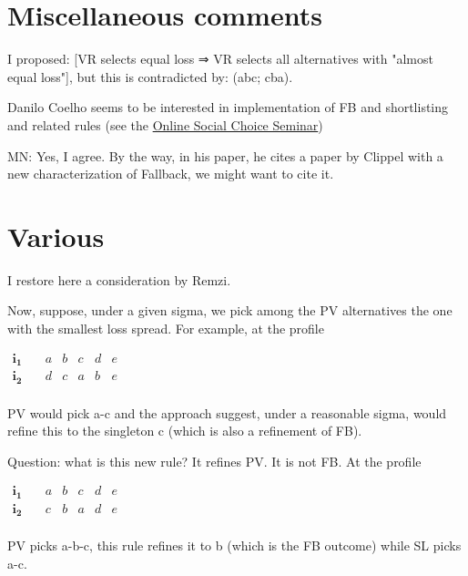 \documentclass[version=3.21, pagesize, twoside=off, bibliography=totoc, DIV=calc, fontsize=12pt, a4paper]{scrartcl}
\begin{document}
\section{Miscellaneous comments}
I proposed: [VR selects equal loss ⇒ VR selects all alternatives with "almost equal loss"], but this is contradicted by: (abc; cba).


Danilo Coelho seems to be interested in implementation of FB and shortlisting and related rules (see the \href{https://www.cmss.auckland.ac.nz/2020/06/03/online-social-choice-seminar-series/}{Online Social Choice Seminar})

\color{green}MN: Yes, I agree. By the way, in his paper, he cites a paper by Clippel with a new characterization of Fallback, we might want to cite it.\color{black}



\appendix
\section{Various}
I restore here a consideration by Remzi.

\begin{remark}[Consideration]
Now, suppose, under a given sigma, we pick among the PV alternatives the one with the smallest loss spread. For example, at the profile 
\begin{center}
	$
	\begin{array}{cccccc}
		\mathbf{i_1} \quad &a&b&c&d&e\\
		\mathbf{i_2} \quad &d&c&a&b&e\\
	\end{array}
	$
\end{center}

PV would pick a-c and the approach suggest, under a reasonable sigma, would refine this to the singleton c (which is also a refinement of FB).

Question: what is this new rule? It refines PV. It is not FB. At the profile

\begin{center}
	$
	\begin{array}{cccccc}
		\mathbf{i_1} \quad &a&b&c&d&e\\
		\mathbf{i_2} \quad &c&b&a&d&e\\
	\end{array}
	$
\end{center}

PV picks a-b-c, this rule refines it to b (which is the FB outcome) while SL picks a-c.
\end{remark}
\end{document}

